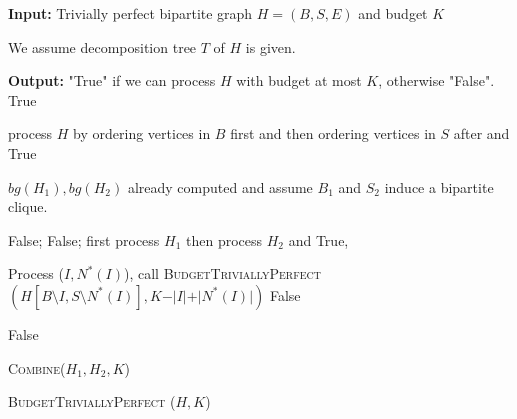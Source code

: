\documentclass[letterpaper,11pt,abstracton]{scrartcl}
\begin{document}
\begin{algorithm}[H]
\begin{algorithmic}[1]
\State \textbf{Input:} Trivially perfect bipartite graph $H=(B,S,E)$ and budget $K$\;

\Comment We assume decomposition tree $T$ of $H$ is given.

\State \textbf{Output:} "True" if we can process $H$ with budget at most $K$, otherwise "False".\;
 \Return True\;
\EndIf

process $H$ by ordering vertices in $B$ first and then ordering vertices in $S$ after and \Return True\;
\EndIf
{}\label{if-join}

\Comment $bg(H_1),bg(H_2)$ already computed and assume $B_1$ and $S_2$ induce a bipartite clique.

 \Return False;
 \Return False;
\Else {}  first process $H_1$ then process $H_2$ and \Return True,
\EndIf
\EndIf \label{if-join-end}


  \State Process ($I,N^*(I)$),
     \State \Return call \textsc{BudgetTriviallyPerfect}
     $(H[B \setminus I,S \setminus N^{*}(I)],K-\vert I\vert +\vert N^{*}(I)\vert)$\;
\EndIf {}
\Return False\;
\EndIf \label{lastIF}







  \Return False\;



 \Else {} \Return \textsc{Combine}($H_1,H_2, K$)
 \EndIf

\EndIf

\end{algorithmic}
\caption{{\textsc{BudgetTriviallyPerfect}} ($H, K$)}
\label{alg:trivially-perfect}
\end{algorithm}
\end{document}
